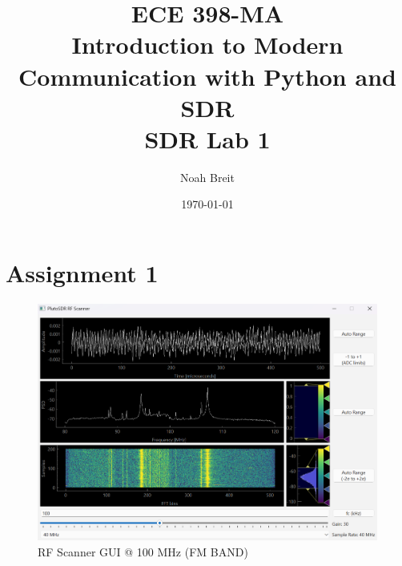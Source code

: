 \documentclass[
	letterpaper, %
	10pt, %
]{CSUniSchoolLabReport}
\title{ECE 398-MA \\ Introduction to Modern Communication with Python and SDR \\ SDR Lab 1} %
\author{Noah Breit} %
\date{\today} %
\begin{document}
\maketitle %




\section{Assignment 1}

\begin{figure}[H] %
	\centering %
	\includegraphics[width=1.2\textwidth]{assignment1a.png} %
	\caption{RF Scanner GUI @ 100 MHz (FM BAND)}
	\label{fig:block}
\end{figure}
\end{document}
